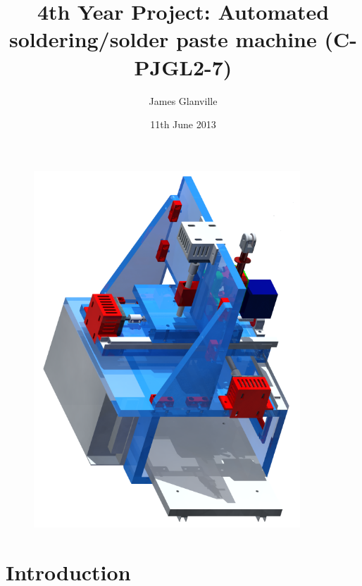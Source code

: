 \usepackage{listings}                  %
\lstset{
	basicstyle=\ttfamily,
  basicstyle = \small
}

\providecommand{\e}[1]{\ensuremath{\times10^{#1}}}
\providecommand{\degrees}{\ensuremath{^{\circ}}}

\title{4th Year Project: Automated soldering/solder paste machine (C-PJGL2-7)} %
\author{James Glanville}
\date{11th June 2013}

\hypersetup{
    colorlinks,
    allcolors=blue,
    linktoc=all,
}



\maketitle

\begin{figure}[ht!]
\centering
\includegraphics[width=100mm]{resources/render.png}
\label{render}
\end{figure}

\newpage
\tableofcontents

\newpage

\section{Introduction}

